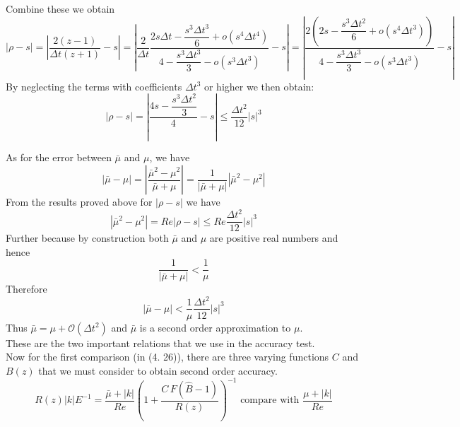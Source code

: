 Combine these we obtain
\begin{equation*}
| \rho - s | = | \dfrac{2 (z - 1)}{\Delta t (z + 1)} - s |
= | \dfrac{2}{\Delta t} \dfrac{2 s \Delta t - \dfrac{s^3 \Delta t^3}{6} + o(s^4 \Delta t^4)}{4 - \dfrac{s^3 \Delta t^3}{3} - o (s^3 \Delta t^3)} - s |
= | \dfrac{2 (2 s - \dfrac{s^3 \Delta t^2}{6} + o(s^4 \Delta t^3))}{4 - \dfrac{s^3 \Delta t^3}{3} - o (s^3 \Delta t^3)} - s |
\end{equation*}
By neglecting the terms with coefficients $\Delta t^3$ or higher we then obtain:
\begin{dmath}
| \rho - s | = | \dfrac{4 s - \dfrac{s^3 \Delta t^2}{3}}{4} - s | \leq \dfrac{\Delta t^2}{12} | s |^3
\end{dmath}

As for the error between $\bar{\mu}$ and $\mu$, we have
\begin{equation}
|\bar{\mu} - \mu| = | \dfrac{\bar{\mu}^2 - \mu^2}{\bar{\mu} + \mu} | = \dfrac{1}{| \bar{\mu} + \mu |} | \bar{\mu}^2 - \mu^2 |
\end{equation}
From the results proved above for $| \rho - s|$ we have
\begin{equation*}
|\bar{\mu}^2 - \mu^2 | = Re |\rho - s| \leq Re \dfrac{\Delta t^2}{12} | s |^3
\end{equation*}
Further because by construction both $\bar{\mu}$ and $\mu$ are positive real numbers and hence
\begin{equation*}
\dfrac{1}{| \bar{\mu} + \mu |} < \dfrac{1}{\mu}
\end{equation*}
Therefore
\begin{equation}
|\bar{\mu} - \mu| < \dfrac{1}{\mu} \dfrac{\Delta t^2}{12} | s |^3
\end{equation}
Thus $\bar{\mu} = \mu + \mathcal{O} (\Delta t^2)$ and $\bar{\mu}$ is a second order approximation to $\mu$.\\

These are the two important relations that we use in the accuracy test.\\

Now for the first comparison (in (4. 26)), there are three varying functions $C$ and $B(z)$ that we must consider to obtain second order accuracy.
\begin{equation*}
R(z) |k|E^{-1} = \dfrac{\bar{\mu} + |k|}{Re}(1 + \dfrac{C \, F(\hat{B} - 1)}{R(z)})^{-1} \text{ compare with } \dfrac{\mu + |k|}{Re} 
\end{equation*}


